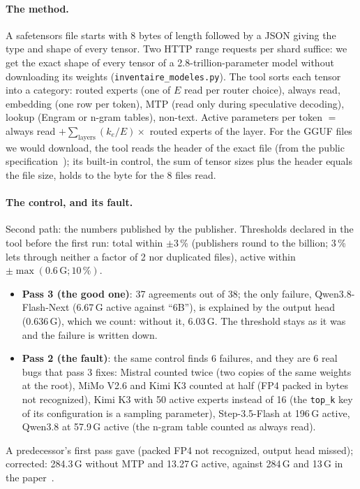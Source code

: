 \paragraph{The method.} A safetensors file starts with 8 bytes of length followed by a JSON giving the type and shape of every tensor. Two HTTP range requests per shard suffice: we get the exact shape of every tensor of a 2.8-trillion-parameter model without downloading its weights (\texttt{inventaire\_modeles.py}). The tool sorts each tensor into a category: routed experts (one of $E$ read per router choice), always read, embedding (one row per token), MTP (read only during speculative decoding), lookup (Engram or n-gram tables), non-text. Active parameters per token $=$ always read $+ \sum_{\text{layers}} (k_e/E) \times$ routed experts of the layer. For the GGUF files we would download, the tool reads the header of the exact file (from the public specification~\cite{gguf2026}); its built-in control, the sum of tensor sizes plus the header equals the file size, holds to the byte for the 8 files read.

\paragraph{The control, and its fault.} Second path: the numbers published by the publisher. Thresholds declared in the tool before the first run: total within $\pm 3$\,\% (publishers round to the billion; 3\,\% lets through neither a factor of 2 nor duplicated files), active within $\pm\max(0.6\,\mathrm{G} ; 10\,\%)$.
\begin{itemize}
\item \textbf{Pass 3 (the good one)}: 37 agreements out of 38; the only failure, Qwen3.8-Flash-Next (6.67\,G active against \enquote{6B}), is explained by the output head (0.636\,G), which we count: without it, 6.03\,G. The threshold stays as it was and the failure is written down.
\item \textbf{Pass 2 (the fault)}: the same control finds 6 failures, and they are 6 real bugs that pass 3 fixes: Mistral counted twice (two copies of the same weights at the root), MiMo V2.6 and Kimi K3 counted at half (FP4 packed in bytes not recognized), Kimi K3 with 50 active experts instead of 16 (the \texttt{top\_k} key of its configuration is a sampling parameter), Step-3.5-Flash at 196\,G active, Qwen3.8 at 57.9\,G active (the n-gram table counted as always read).
\end{itemize}
A predecessor's first pass gave  (packed FP4 not recognized, output head missed); corrected: 284.3\,G without MTP and 13.27\,G active, against 284\,G and 13\,G in the paper~\cite{deepseekv4_2026}.


